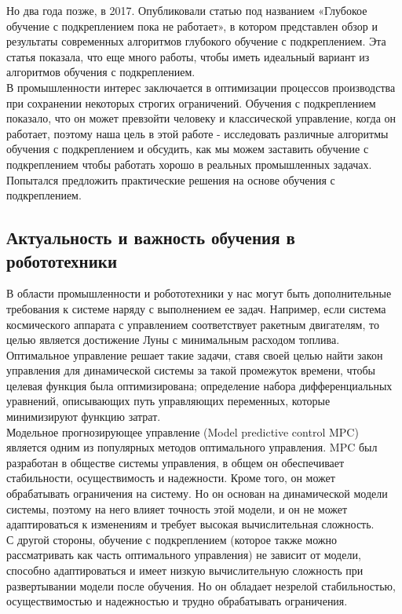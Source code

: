 \documentclass[a4paper,12pt]{article}
\begin{document}
Но два года позже, в 2017. Опубликовали статью под названием «Глубокое обучение с подкреплением пока не работает», в котором представлен обзор и результаты современных алгоритмов глубокого обучение с подкреплением. Эта статья показала, что еще много работы, чтобы иметь идеальный вариант из алгоритмов обучения с подкреплением.\\

В промышленности интерес заключается в оптимизации процессов производства при сохранении некоторых строгих ограничений. Обучения с подкреплением показало, что он может превзойти человеку и классической управление, когда он работает, поэтому наша цель в этой работе - исследовать различные алгоритмы обучения с подкреплением и обсудить, как мы можем заставить обучение с подкреплением чтобы работать хорошо в реальных промышленных задачах. Попытался предложить практические решения на основе  обучения с подкреплением.\\

\subsection{Актуальность и важность обучения в робототехники}
В области промышленности и робототехники у нас могут быть дополнительные требования к системе наряду с выполнением ее задач. Например, если система космического аппарата с управлением соответствует ракетным двигателям, то целью является достижение Луны с минимальным расходом топлива. 
Оптимальное управление решает такие задачи, ставя своей целью найти закон управления для динамической системы за такой промежуток времени, чтобы целевая функция была оптимизирована; определение набора дифференциальных уравнений, описывающих путь управляющих переменных, которые минимизируют функцию затрат.\\

Модельное прогнозирующее управление (Model predictive control MPC) является одним из популярных методов оптимального управления. MPC был разработан в обществе системы управления, в общем он обеспечивает стабильности, осуществимость и надежности. Кроме того, он может обрабатывать ограничения на систему. Но он основан на динамической модели системы, поэтому на него влияет точность этой модели, и он не может адаптироваться к изменениям и требует высокая вычислительная сложность.\\

С другой стороны, обучение с подкреплением (которое также можно рассматривать как часть оптимального управления) не зависит от модели, способно адаптироваться и имеет низкую вычислительную сложность при развертывании модели после обучения. Но он обладает незрелой стабильностью, осуществимостью и надежностью и трудно обрабатывать ограничения.\\
\end{document}
